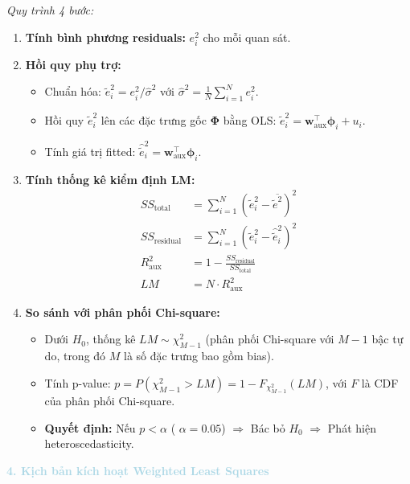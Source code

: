\textit{Quy trình 4 bước:}
\begin{enumerate}
    \item \textbf{Tính bình phương residuals:} $e_i^2$ cho mỗi quan sát.
    
    \item \textbf{Hồi quy phụ trợ:}
    \begin{itemize}
        \item Chuẩn hóa: $\tilde{e}_i^2 = e_i^2 / \hat{\sigma}^2$ với $\hat{\sigma}^2 = \frac{1}{N}\sum_{i=1}^{N} e_i^2$.
        \item Hồi quy $\tilde{e}_i^2$ lên các đặc trưng gốc $\mathbf{\Phi}$ bằng OLS: $\tilde{e}_i^2 = \mathbf{w}_{\text{aux}}^{\top} \boldsymbol{\phi}_i + u_i$.
        \item Tính giá trị fitted: $\hat{\tilde{e}}_i^2 = \mathbf{w}_{\text{aux}}^{\top} \boldsymbol{\phi}_i$.
    \end{itemize}
    
    \item \textbf{Tính thống kê kiểm định LM:}
    \begin{align*}
    SS_{\text{total}} &= \sum_{i=1}^{N} (\tilde{e}_i^2 - \overline{\tilde{e}^2})^2 \\
    SS_{\text{residual}} &= \sum_{i=1}^{N} (\tilde{e}_i^2 - \hat{\tilde{e}}_i^2)^2 \\
    R^2_{\text{aux}} &= 1 - \frac{SS_{\text{residual}}}{SS_{\text{total}}} \\
    LM &= N \cdot R^2_{\text{aux}}
    \end{align*}
    
    \item \textbf{So sánh với phân phối Chi-square:}
    \begin{itemize}
        \item Dưới $H_0$, thống kê $LM \sim \chi^2_{M-1}$ (phân phối Chi-square với $M-1$ bậc tự do, trong đó $M$ là số đặc trưng bao gồm bias).
        \item Tính p-value: $p = P(\chi^2_{M-1} > LM) = 1 - F_{\chi^2_{M-1}}(LM)$, với $F$ là CDF của phân phối Chi-square.
        \item \textbf{Quyết định:} Nếu $p < \alpha$ ( $\alpha = 0.05$) $\Rightarrow$ Bác bỏ $H_0$ $\Rightarrow$ Phát hiện heteroscedasticity.
    \end{itemize}
\end{enumerate}

\vspace{0.5em}
\noindent\textcolor{lightblue}{\textbf{4. Kịch bản kích hoạt Weighted Least Squares}}
\vspace{0.5em}

